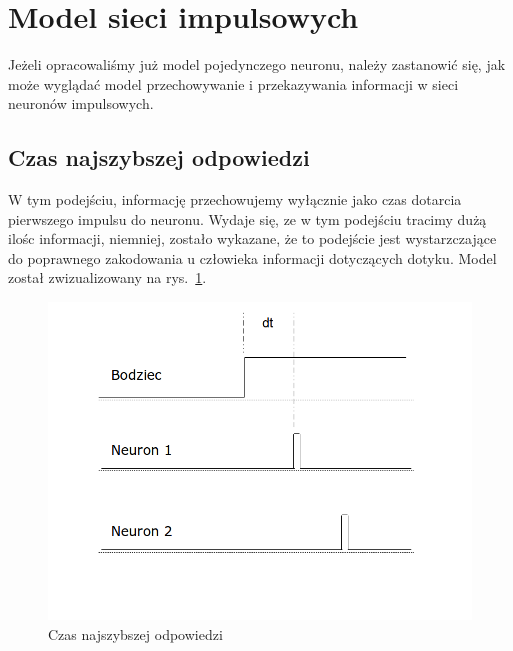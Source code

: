 \section{Model sieci impulsowych}
Jeżeli opracowaliśmy już model pojedynczego neuronu, należy zastanowić się, jak może wyglądać model przechowywanie i przekazywania informacji
w sieci neuronów impulsowych.
\subsection{Czas najszybszej odpowiedzi}
W tym podejściu, informację przechowujemy wyłącznie jako czas dotarcia pierwszego impulsu do neuronu. 
Wydaje się, ze w tym podejściu tracimy dużą ilośc informacji, niemniej, zostało wykazane, że to podejście jest wystarzczające 
do poprawnego zakodowania u człowieka informacji dotyczących dotyku. 
Model został zwizualizowany na rys.~\ref{fig:TimeToFirstSpike}.
	\begin{figure}[ht]
		\centering
		\includegraphics[width=\textwidth/2]{../TimeToFirstSpike.png}
		\caption{Czas najszybszej odpowiedzi}
                \label{fig:TimeToFirstSpike}
	\end{figure}
